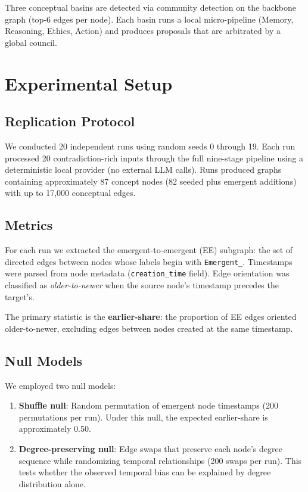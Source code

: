 \documentclass[11pt]{article}
\begin{document}
Three conceptual basins are detected via community detection on the backbone graph (top-6 edges per node). Each basin runs a local micro-pipeline (Memory, Reasoning, Ethics, Action) and produces proposals that are arbitrated by a global council.

\section{Experimental Setup}

\subsection{Replication Protocol}

We conducted 20 independent runs using random seeds 0 through 19. Each run processed 20 contradiction-rich inputs through the full nine-stage pipeline using a deterministic local provider (no external LLM calls). Runs produced graphs containing approximately 87 concept nodes (82 seeded plus emergent additions) with up to 17,000 conceptual edges.

\subsection{Metrics}

For each run we extracted the emergent-to-emergent (EE) subgraph: the set of directed edges between nodes whose labels begin with \texttt{Emergent\_}. Timestamps were parsed from node metadata (\texttt{creation\_time} field). Edge orientation was classified as \emph{older-to-newer} when the source node's timestamp precedes the target's.

The primary statistic is the \textbf{earlier-share}: the proportion of EE edges oriented older-to-newer, excluding edges between nodes created at the same timestamp.

\subsection{Null Models}

We employed two null models:

\begin{enumerate}
\item \textbf{Shuffle null}: Random permutation of emergent node timestamps (200 permutations per run). Under this null, the expected earlier-share is approximately 0.50.
\item \textbf{Degree-preserving null}: Edge swaps that preserve each node's degree sequence while randomizing temporal relationships (200 swaps per run). This tests whether the observed temporal bias can be explained by degree distribution alone.
\end{enumerate}
\end{document}
